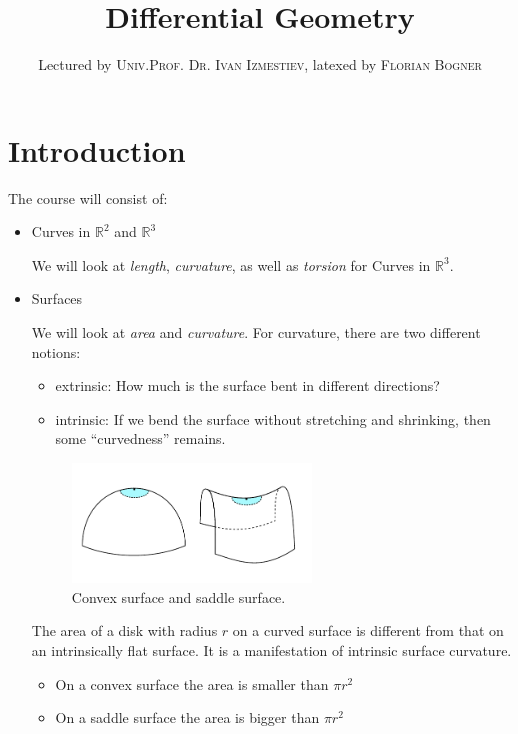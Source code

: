 \documentclass[a4paper,11pt,notitlepage,fullpage]{paper}
\makeatletter
\theoremstyle{plain}
\theoremstyle{definition}
\newcommand*{\toccontents}{\@starttoc{toc}}
\makeatother
\begin{document}
\author{Lectured by \textsc{Univ.Prof. Dr. Ivan Izmestiev}, latexed by \textsc{Florian Bogner}}
\title{Differential Geometry}
\maketitle

\toccontents

\section{Introduction}

The course will consist of:

\begin{itemize}
\item Curves in $\mathbb R^2$ and $\mathbb R^3$

We will look at \emph{length}, \emph{curvature}, as well as \emph{torsion} for Curves in $\mathbb R^3$.

\item Surfaces

We will look at \emph{area} and \emph{curvature}. For curvature, there are two different notions:
\begin{itemize}
\item extrinsic: How much is the surface bent in different directions?
\item intrinsic: If we bend the surface without stretching and shrinking, then some ``curvedness'' remains.
\end{itemize}

\begin{figure}[H]
\centering
\includegraphics[width = 0.6\textwidth]{img/intrinsic-curvature}
\caption{Convex surface and saddle surface.}
\label{fig:intrinsic}
\end{figure}

The area of a disk with radius $r$ on a curved surface is different from that on an intrinsically flat surface. It is a manifestation of intrinsic surface curvature.

\begin{itemize}
\item On a convex surface the area is smaller than $\pi r^2$
\item On a saddle surface the area is bigger than $\pi r^2$
\end{itemize}



\end{itemize}
\end{document}
